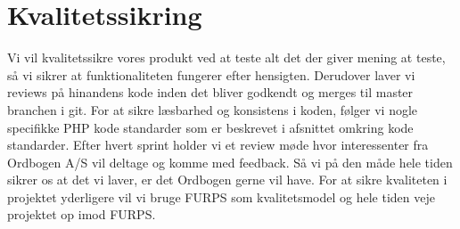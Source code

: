 \section*{Kvalitetssikring}
Vi vil kvalitetssikre vores produkt ved at teste alt det der giver mening at teste,
så vi sikrer at funktionaliteten fungerer efter hensigten. Derudover laver vi reviews på hinandens kode inden
det bliver godkendt og merges til master branchen i git.
For at sikre læsbarhed og konsistens i koden, følger vi nogle specifikke PHP kode standarder som er beskrevet i afsnittet omkring kode standarder.
Efter hvert sprint holder vi et review møde hvor interessenter fra Ordbogen A/S vil deltage og komme med feedback.
Så vi på den måde hele tiden sikrer os at det vi laver, er det Ordbogen gerne vil have.
For at sikre kvaliteten i projektet yderligere vil vi bruge FURPS som kvalitetsmodel og hele tiden
veje projektet op imod FURPS.
